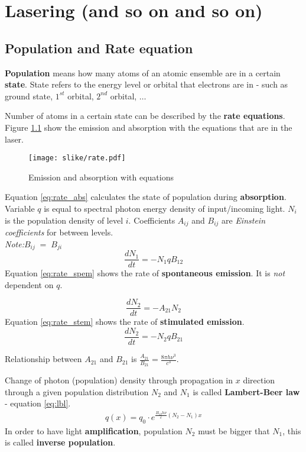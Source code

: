 \chapter{Lasering (and so on and so on)}

\section{Population and Rate equation}

\textbf{Population} means how many atoms of an atomic ensemble are in a certain \textbf{state}.
State refers to the energy level or orbital that electrons are in - such as ground state, $1^{st}$ orbital, $2^{nd}$ orbital, $\dots$

Number of atoms in a certain state can be described by the \textbf{rate equations}. Figure \ref{fig:rate} show the emission and absorption with the equations that 
are in the laser.

\begin{figure}[h!]
    \centering
    \texttt{[image: slike/rate.pdf]}
    \caption{Emission and absorption with equations}
    \label{fig:rate}
\end{figure}

Equation \ref{eq:rate_abs} calculates the state of population during \textbf{absorption}. Variable $q$ is equal to spectral photon energy density of input/incoming light. $N_i$ is
the population density of level $i$. Coefficients $A_{ij}$ and $B_{ij}$ are \textit{Einstein coefficients} for between levels.\\ \textit{Note:}$B_{ij} \;=\; B_{ji}$
\begin{equation}
    \frac{dN_1}{dt} = -N_1 q B_{12}
    \label{eq:rate_abs}
\end{equation}
Equation \ref{eq:rate_spem} shows the rate of \textbf{spontaneous emission}. It is \textit{not} dependent on $q$.

\begin{equation}
    \frac{dN_2}{dt} = -A_{21}N_2
    \label{eq:rate_spem}
\end{equation}
Equation \ref{eq:rate_stem} shows the rate of \textbf{stimulated emission}.
\begin{equation}
    \frac{dN_2}{dt} = -N_2 q B_{21}
    \label{eq:rate_stem}
\end{equation}

Relationship between $A_{21}$ and $B_{21}$ is $ \frac{A_{21}}{B_{21}} = \frac{8 \pi h \nu^3}{c^3} $.

Change of photon (population) density through propagation in $x$ direction through a
given population distribution $N_2$ and $N_1$  is called \textbf{Lambert-Beer law} - equation \ref{eq:lbl}.
\begin{eqnarray}
    q(x) = q_0 \cdot e^{\frac{B_{12} h \nu}{c}(N_2 -N_1)x}
    \label{eq:lbl}
\end{eqnarray}
In order to have light \textbf{amplification}, population $N_2$ must be bigger that $N_1$, this is called \textbf{inverse population}.

